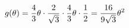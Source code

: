 \documentclass[preview]{standalone}
\begin{document}
\begin{align*}
g( \theta ) = {4 \over 3} \theta \cdot {2 \over \sqrt{3}} \cdot {4 \over 3} \theta \cdot {1 \over 2} = {16 \over 9\sqrt{3}} \theta ^2
\end{align*}
\end{document}
